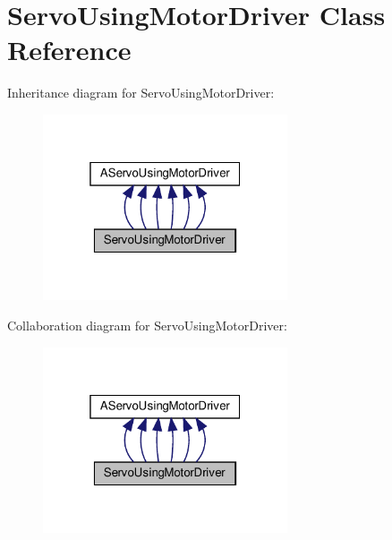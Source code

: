 \hypertarget{classServoUsingMotorDriver}{}\section{Servo\+Using\+Motor\+Driver Class Reference}
\label{classServoUsingMotorDriver}


Inheritance diagram for Servo\+Using\+Motor\+Driver\+:
\nopagebreak
\begin{figure}[H]
\begin{center}
\leavevmode
\includegraphics[width=205pt]{classServoUsingMotorDriver__inherit__graph}
\end{center}
\end{figure}


Collaboration diagram for Servo\+Using\+Motor\+Driver\+:
\nopagebreak
\begin{figure}[H]
\begin{center}
\leavevmode
\includegraphics[width=205pt]{classServoUsingMotorDriver__coll__graph}
\end{center}
\end{figure}
